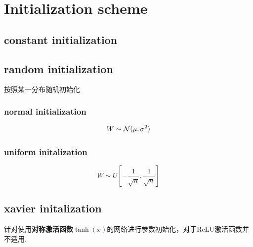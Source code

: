 \section{Initialization scheme}
\subsection{constant initialization}

\subsection{random initialization}
按照某一分布随机初始化
\subsubsection{normal initialization}
\begin{equation}
    W \sim \mathcal{N}(\mu, \sigma^2)
\end{equation}

\subsubsection{uniform initalization}
\begin{equation}
    W \sim U[-\frac{1}{\sqrt{n}}, \frac{1}{\sqrt{n}}]
\end{equation}

\subsection{xavier initalization}
针对使用\textbf{对称激活函数}$\tanh(x)$的网络进行参数初始化，对于ReLU激活函数并不适用\cite{Glorot2010}.

